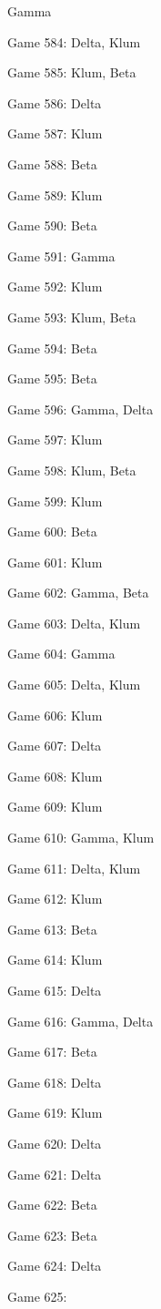 \documentclass{article}
\begin{document}
\begin{multicols}{3}
\begin{compactitem}
Gamma
\item Game 584:
Delta, Klum
\item Game 585:
Klum, Beta
\item Game 586:
Delta
\item Game 587:
Klum
\item Game 588:
Beta
\item Game 589:
Klum
\item Game 590:
Beta
\item Game 591:
Gamma
\item Game 592:
Klum
\item Game 593:
Klum, Beta
\item Game 594:
Beta
\item Game 595:
Beta
\item Game 596:
Gamma, Delta
\item Game 597:
Klum
\item Game 598:
Klum, Beta
\item Game 599:
Klum
\item Game 600:
Beta
\item Game 601:
Klum
\item Game 602:
Gamma, Beta
\item Game 603:
Delta, Klum
\item Game 604:
Gamma
\item Game 605:
Delta, Klum
\item Game 606:
Klum
\item Game 607:
Delta
\item Game 608:
Klum
\item Game 609:
Klum
\item Game 610:
Gamma, Klum
\item Game 611:
Delta, Klum
\item Game 612:
Klum
\item Game 613:
Beta
\item Game 614:
Klum
\item Game 615:
Delta
\item Game 616:
Gamma, Delta
\item Game 617:
Beta
\item Game 618:
Delta
\item Game 619:
Klum
\item Game 620:
Delta
\item Game 621:
Delta
\item Game 622:
Beta
\item Game 623:
Beta
\item Game 624:
Delta
\item Game 625:

\end{compactitem}
\end{multicols}
\end{document}
